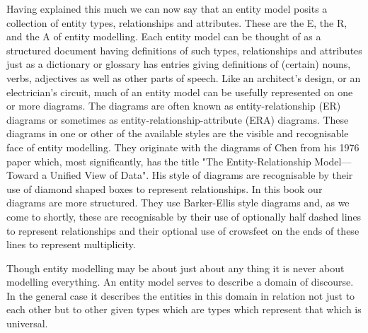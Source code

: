 \mynote Having explained this much we can now say that an entity model posits a collection of entity types, relationships and attributes. These are the E, the R, and the A of entity modelling.
Each entity model can be thought of as a structured document having definitions of such  types, relationships and attributes just as a dictionary or glossary has entries giving definitions of (certain) nouns, verbs, adjectives as well as other parts of speech. Like an architect's design, or an electrician's circuit, much of an entity model can be usefully represented on one or more diagrams. The diagrams are often known as entity-relationship (ER) diagrams or sometimes as  entity-relationship-attribute (ERA) diagrams. 
These diagrams in one or other of the available styles are the visible and recognisable face of entity modelling. They originate with the diagrams of Chen from his 1976 paper which, most significantly, has the title 
"The Entity-Relationship Model---Toward a Unified View of Data". His style of diagrams are recognisable by their use of diamond shaped boxes to represent relationships. In this book our diagrams are more structured. They use Barker-Ellis style diagrams and, as we come to shortly, these are recognisable by their use of optionally half dashed lines to represent relationships and their optional use of crowsfeet on the ends of these lines to represent multiplicity. 

\mynote Though entity modelling may be about just about any thing it is never about modelling everything.
An entity model serves to describe a domain of discourse. In the general case it describes the entities in this domain in relation not just to each other but to other given types which are types which  represent that which is universal. 

